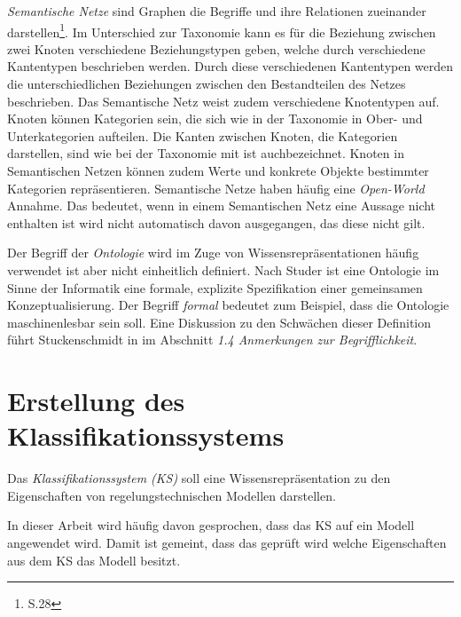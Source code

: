 \textit{Semantische Netze} \glqq sind Graphen die Begriffe und ihre Relationen zueinander darstellen\grqq\footnote{\cite{STU09} S.28}. Im Unterschied zur Taxonomie kann es für die Beziehung zwischen zwei Knoten verschiedene Beziehungstypen geben, welche durch verschiedene Kantentypen beschrieben werden. Durch diese verschiedenen Kantentypen werden die unterschiedlichen Beziehungen zwischen den Bestandteilen des Netzes beschrieben. Das Semantische Netz weist zudem verschiedene Knotentypen auf. Knoten können Kategorien sein, die sich wie in der Taxonomie in Ober- und Unterkategorien aufteilen. Die Kanten zwischen Knoten, die Kategorien darstellen, sind wie bei der Taxonomie mit \glqq ist auch\grqq bezeichnet. Knoten in Semantischen Netzen können zudem Werte und konkrete Objekte bestimmter Kategorien repräsentieren.
Semantische Netze haben häufig eine \textit{Open-World} Annahme. Das bedeutet, wenn in einem Semantischen Netz eine Aussage nicht enthalten ist wird nicht automatisch davon ausgegangen, das diese nicht gilt.

Der Begriff der \textit{Ontologie} wird im Zuge von Wissensrepräsentationen häufig verwendet ist aber nicht einheitlich definiert. Nach Studer \cite{STBEFE98} ist eine Ontologie im Sinne der Informatik eine \glqq formale, explizite Spezifikation einer gemeinsamen Konzeptualisierung\grqq. Der Begriff \textit{formal} bedeutet zum Beispiel, dass die Ontologie maschinenlesbar sein soll. Eine Diskussion zu den Schwächen dieser Definition führt Stuckenschmidt in \cite{STU09} im Abschnitt \textit{1.4 Anmerkungen zur Begrifflichkeit}. 
\section{Erstellung des Klassifikationssystems}
\label{Ch:Vorbetrachtung:Sec:KS}
Das \textit{Klassifikationssystem (KS)} soll eine Wissensrepräsentation zu den Eigenschaften von regelungstechnischen Modellen darstellen. 

In dieser Arbeit wird häufig davon gesprochen, dass das KS auf ein Modell angewendet wird. Damit ist gemeint, dass das geprüft wird welche Eigenschaften aus dem KS das Modell besitzt. 

